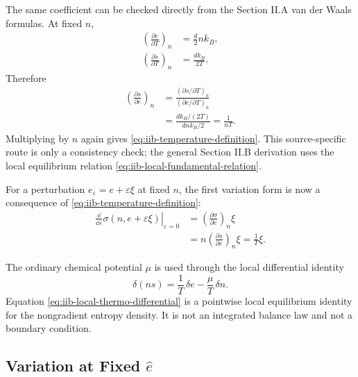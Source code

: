 The same coefficient can be checked directly from the Section II.A van der
Waals formulas.  At fixed \(n\),
\begin{align}
  \left(\frac{\partial e}{\partial T}\right)_n
  &=\frac{d}{2}n k_B,\\
  \left(\frac{\partial s}{\partial T}\right)_n
  &=\frac{d k_B}{2T}.
  \label{eq:iib-section-iia-fixed-n-derivatives}
\end{align}
Therefore
\begin{align}
  \left(\frac{\partial s}{\partial e}\right)_n
  &=
  \frac{(\partial s/\partial T)_n}{(\partial e/\partial T)_n} \\
  &=
  \frac{d k_B/(2T)}{d n k_B/2}
  =
  \frac{1}{nT}.
  \label{eq:iib-section-iia-temperature-check}
\end{align}
Multiplying by \(n\) again gives \eqref{eq:iib-temperature-definition}.  This
source-specific route is only a consistency check; the general Section II.B
derivation uses the local equilibrium relation
\eqref{eq:iib-local-fundamental-relation}.

For a perturbation \(e_\varepsilon=e+\varepsilon\xi\) at fixed \(n\), the
first variation form is now a consequence of
\eqref{eq:iib-temperature-definition}:
\begin{align}
  \left.
  \frac{\dd}{\dd\varepsilon}
  \sigma(n,e+\varepsilon\xi)
  \right|_{\varepsilon=0}
  &=
  \left(\frac{\partial\sigma}{\partial e}\right)_n\xi \\
  &=
  n\left(\frac{\partial s}{\partial e}\right)_n\xi
  =
  \frac{1}{T}\xi .
  \label{eq:iib-temperature-first-variation-check}
\end{align}

The ordinary chemical potential \(\mu\) is used through the local differential
identity
\begin{equation}
  \delta(n s)
  =
  \frac{1}{T}\,\delta e
  -
  \frac{\mu}{T}\,\delta n .
  \label{eq:iib-local-thermo-differential}
\end{equation}
Equation \eqref{eq:iib-local-thermo-differential} is a pointwise local
equilibrium identity for the nongradient entropy density.  It is not an
integrated balance law and not a boundary condition.

\subsection{Variation at Fixed \texorpdfstring{\(\hat e\)}{ehat}}

